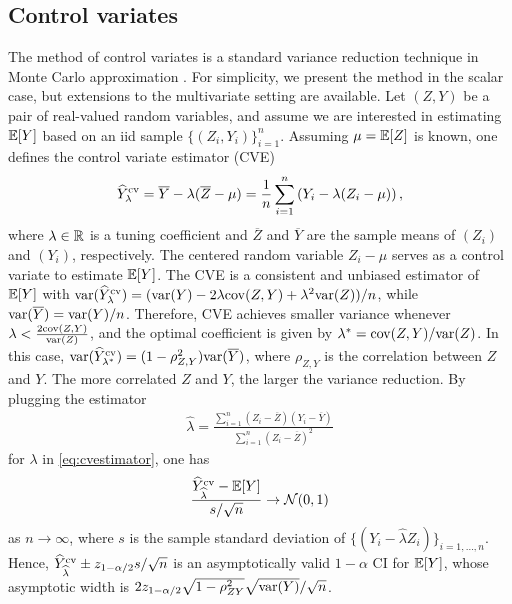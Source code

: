 
\subsection{Control variates}
The method of control variates is a standard variance reduction technique in Monte Carlo approximation \citep[\S4.1]{Glasserman2003}. For simplicity, we present the method in the scalar case, but extensions to the multivariate setting are available.
Let $(Z,Y)$ be a pair of real-valued random variables, and assume we are interested in estimating $\mathbb E [Y]$ based on an iid sample $\{(Z_i,Y_i)\}_{i=1}^n$. Assuming $\mu=\mathbb E [Z]$ is known, one defines the control variate estimator (CVE)
\begin{align}
    \widehat Y^{\mathrm{cv}}_\lambda=\overline Y - \lambda (\overline Z - \mu)=\frac{1}{n}\sum_{i=1}^n \left( Y_i - \lambda(Z_i-\mu)\right), \label{eq:cvestimator}
\end{align}
where $\lambda\in\mathbb R$ is a tuning coefficient and $\overline Z$ and $\overline Y$ are the sample means of $(Z_i)$ and $(Y_i)$, respectively. The centered random variable $Z_i-\mu$ serves as a control variate to estimate $\mathbb E[Y]$. The CVE is a consistent and unbiased estimator of $\mathbb E[Y]$ with $\mathrm{var}(\widehat Y^{\mathrm{cv}}_\lambda)=(\mathrm{var}(Y)-2\lambda \mathrm{cov}(Z,Y)+\lambda^2 \mathrm{var}(Z))/n$, while $\mathrm{var}(\overline Y)=\mathrm{var}(Y)/n$. Therefore, CVE achieves smaller variance whenever $\lambda<\frac{2\mathrm{cov}(Z,Y)}{\mathrm{var}(Z)}$, and the optimal coefficient is given by $\lambda^* = \mathrm{cov}(Z,Y) / \mathrm{var}(Z)$.
In this case, $\mathrm{var}(\widehat Y^{\mathrm{cv}}_{\lambda^*}) =(1-\rho_{Z,Y}^2)\mathrm{var}(\overline Y)$, where $\rho_{Z,Y}$ is the correlation between $Z$ and $Y$. The more correlated $Z$ and $Y$, the larger the variance reduction.
By plugging the estimator 
\begin{align}
    \widehat \lambda = \frac{\sum_{i=1}^n (Z_i-\overline Z)(Y_i-\overline Y) }{\sum_{i=1}^n (Z_i-\overline Z)^2 } \label{eq:estimatorlambda}
\end{align}
for $\lambda$ in \cref{eq:cvestimator}, one has
$$
    \frac{\widehat Y^{\mathrm{cv}}_{\widehat \lambda} - \mathbb E[Y]}{s/\sqrt{n}}\to \mathcal N(0,1)
$$
as $n\to\infty$, where $s$ is the sample standard deviation of $\{(Y_i - \widehat\lambda Z_i)\}_{i=1,\ldots,n}$. Hence, $\widehat Y^{\mathrm{cv}}_{\widehat \lambda} \pm z_{1-\alpha/2}s/\sqrt{n}$ is an asymptotically valid $1-\alpha$ CI for $\mathbb E[Y]$, whose asymptotic width is $2z_{1-\alpha/2}\sqrt{1-\rho_{ZY}^2}\sqrt{\mathrm{var}(Y)}/\sqrt{n}$.

